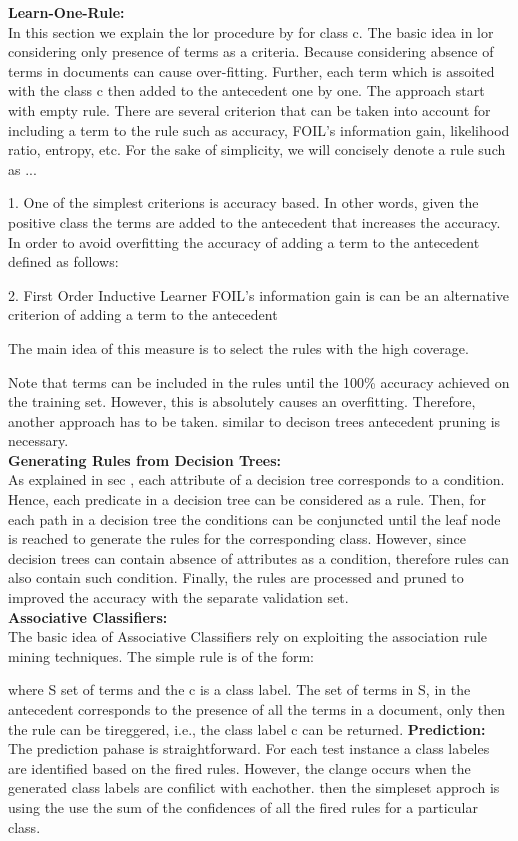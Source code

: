 \textbf{Learn-One-Rule:}\\
In this section we explain the lor procedure by for class c. The basic idea in lor considering only presence of terms as a criteria. Because considering 
absence of terms in documents can cause over-fitting. 
Further, each term which is assoited with the class c then added to the antecedent one by one. The approach start with empty rule. There are several criterion that can be taken into account for including a term to the rule such as accuracy, FOIL’s information gain, likelihood ratio, entropy, etc.
For the sake of simplicity, we will concisely denote a rule such as ...

1. One of the simplest criterions is accuracy based. In other words, given the positive class the terms are added to the antecedent that increases the accuracy. In order to avoid overfitting the accuracy of adding a term to the antecedent defined as follows:

2. First Order Inductive Learner FOIL’s information gain is can be an alternative criterion of adding a term to the antecedent

The main idea of this measure is to select the rules with the high coverage. 

Note that terms can be included in the rules until the 100\% accuracy achieved on the training set. However, this is absolutely causes an overfitting. Therefore, another approach has to be taken. similar to decison trees antecedent pruning is necessary.\\

\textbf{Generating Rules from Decision Trees:}\\
As explained in sec , each attribute of a decision tree corresponds to a condition. Hence, each predicate in a decision tree can be considered as a rule. Then, for each path in a decision tree the conditions can be conjuncted until the leaf node is reached to generate the rules for the corresponding class. However, since decision trees can contain absence of attributes as a condition, therefore rules can also contain such condition. Finally, the rules are processed and pruned to improved the accuracy with the separate validation set. \\
\textbf{Associative Classifiers:}\\
The basic idea of Associative Classifiers rely on exploiting the association rule mining techniques.
The simple rule is of the form:

where S set of terms and the c is a class label. The set of terms in S, in the antecedent corresponds to the presence of all the terms in a document, only then the rule can be tireggered, i.e., the class label c can be returned. 
\textbf{Prediction:}
The prediction pahase is straightforward. For each test instance a class labeles are identified based on the fired rules. However, the clange occurs when the generated class labels are confilict with eachother. then the simpleset approch is using the use the sum of the confidences of all the fired rules for a particular class.

